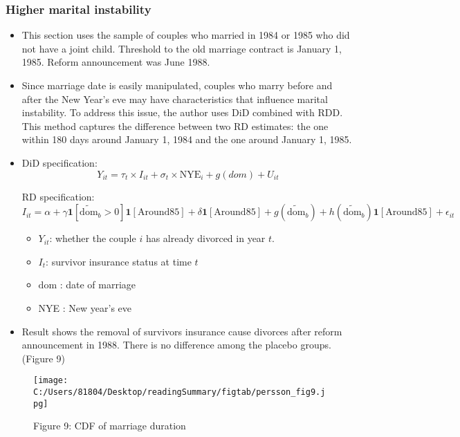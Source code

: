 \documentclass[a4paper, 12pt]{article}
\renewcommand{\vec}[1]{\mathbf{#1}}
\begin{document}
\subsubsection{Higher marital instability}
\begin{itemize}
\item This section uses the sample of couples who married in 1984 or 1985 who did not have a joint child. Threshold to the old marriage contract is January 1, 1985. Reform announcement was June 1988.
\item Since marriage date is easily manipulated, couples who marry before and after the New Year's eve may have characteristics that influence marital instability. To address this issue, the author uses DiD combined with RDD. This method captures the difference between two RD estimates: the one within 180 days around January 1, 1984 and the one around January 1, 1985.
\item DiD specification:
\begin{equation}
Y_{it} = \tau_t \times I_{it} + \sigma_t \times \text{NYE}_i + g(dom) + U_{it}
\end{equation}

RD specification:
\begin{equation}
I_{it} = \alpha + \gamma \vec{1}[\tilde{\text{dom}}_b>0]\vec{1}[\text{Around85}]
+\delta\vec{1}[\text{Around85}]
+ g(\tilde{\text{dom}}_b) 
+ h(\tilde{\text{dom}}_b)\vec{1}[\text{Around85}]+\epsilon_{it}
\end{equation}
\begin{itemize}
\item $Y_{it}$: whether the couple $i$ has already divorced in year $t$.
\item $I_t$: survivor insurance status at time $t$
\item $\text{dom}$ : date of marriage
\item NYE : New year's eve
\end{itemize}

\item Result shows the removal of survivors insurance cause divorces after reform announcement in 1988. There is no difference among the placebo groups. (Figure 9)
\end{itemize}

\begin{figure}[h!]
\center
\texttt{[image: C:/Users/81804/Desktop/readingSummary/figtab/persson\_fig9.jpg]}
\caption*{Figure 9: CDF of marriage duration}
\end{figure}
\end{document}
